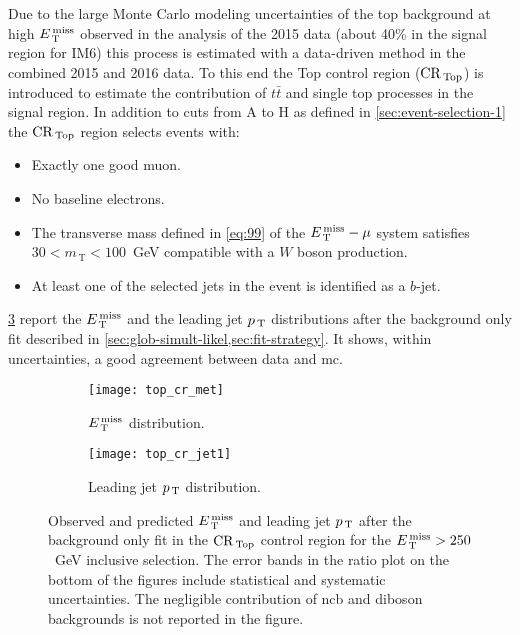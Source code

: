 Due to the large Monte Carlo modeling uncertainties of the top background at
high $E_\mathrm{\, T}^\mathrm{\, miss}$ observed in the analysis of the 2015 data (about 40\% in the signal
region for IM6) this process is estimated with a data-driven method in the
combined 2015 and 2016 data. To this end the Top control region ($\mathrm{CR}_\mathrm{\, Top}$) is
introduced to estimate the contribution of $t \bar{t}$ and single top processes
in the signal region. In addition to cuts from A to H as defined in
\cref{sec:event-selection-1} the $\mathrm{CR}_\mathrm{\, Top}$ region selects events with:
\begin{itemize}
\item Exactly one good muon.
\item No baseline electrons.
\item The transverse mass defined in \eqref{eq:99} of the $E_\mathrm{\, T}^\mathrm{\, miss} - \mu$ system
  satisfies $30 < m_\mathrm{\, T} < 100$~GeV compatible with a $W$ boson
  production.
\item At least one of the selected jets in the event is identified as a $b$-jet.
\end{itemize}
\cref{fig:top_plots} report the $E_\mathrm{\, T}^\mathrm{\, miss}$ and the leading jet $p_\mathrm{\, T}$ distributions
after the background only fit described in
\cref{sec:glob-simult-likel,sec:fit-strategy}. It shows, within uncertainties, a
good agreement between data and \gls{mc}.
\begin{figure}[!th]
  \centering
  \begin{subfigure}[t]{.48\linewidth}
    \texttt{[image: top\_cr\_met]}
    \caption{$E_\mathrm{\, T}^\mathrm{\, miss}$ distribution.}
    \label{fig:top_cr_et_miss}
  \end{subfigure}
  \begin{subfigure}[t]{.48\linewidth}
    \texttt{[image: top\_cr\_jet1]}
    \caption{Leading jet $p_\mathrm{\, T}$ distribution.}
    \label{fig:top_cr_jet1}
  \end{subfigure}
  \caption{Observed and predicted $E_\mathrm{\, T}^\mathrm{\, miss}$ and leading jet $p_\mathrm{\, T}$ after the
    background only fit in the $\mathrm{CR}_\mathrm{\, Top}$ control region for the $E_\mathrm{\, T}^\mathrm{\, miss} > 250$~GeV
    inclusive selection. The error bands in the ratio plot on the bottom of the
    figures include statistical and systematic uncertainties. The negligible
    contribution of \gls{ncb} and diboson backgrounds is not reported in the
    figure.}
  \label{fig:top_plots}
\end{figure}
